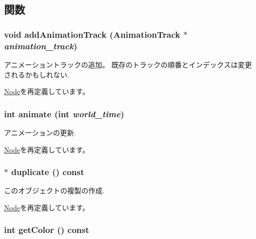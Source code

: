 \subsection{関数}
\hypertarget{classm3g_1_1Light_415c0b110f95410ded9b85e5d99a496b}{
\subsubsection[{addAnimationTrack}]{\setlength{\rightskip}{0pt plus 5cm}void addAnimationTrack ({\bf AnimationTrack} $\ast$ {\em animation\_\-track})}}
\label{classm3g_1_1Light_415c0b110f95410ded9b85e5d99a496b}


アニメーショントラックの追加。 既存のトラックの順番とインデックスは変更されるかもしれない. 

\hyperlink{classm3g_1_1Node_415c0b110f95410ded9b85e5d99a496b}{Node}を再定義しています。\hypertarget{classm3g_1_1Light_8aad1ceab4c2a03609c8a42324ce484d}{
\subsubsection[{animate}]{\setlength{\rightskip}{0pt plus 5cm}int animate (int {\em world\_\-time})}}
\label{classm3g_1_1Light_8aad1ceab4c2a03609c8a42324ce484d}


アニメーションの更新. 

\hyperlink{classm3g_1_1Node_8aad1ceab4c2a03609c8a42324ce484d}{Node}を再定義しています。\hypertarget{classm3g_1_1Light_7a41af040d0c1566358d84f089cd0cd1}{
\subsubsection[{duplicate}]{ $\ast$ duplicate () const}}
\label{classm3g_1_1Light_7a41af040d0c1566358d84f089cd0cd1}


このオブジェクトの複製の作成. 

\hyperlink{classm3g_1_1Node_0b9f7531a4b56d34f47aeb1fff0d37e0}{Node}を再定義しています。\hypertarget{classm3g_1_1Light_4cfa1931c265ec3412fe3f6408a1b4f5}{
\subsubsection[{getColor}]{\setlength{\rightskip}{0pt plus 5cm}int getColor () const}}
\label{classm3g_1_1Light_4cfa1931c265ec3412fe3f6408a1b4f5}


